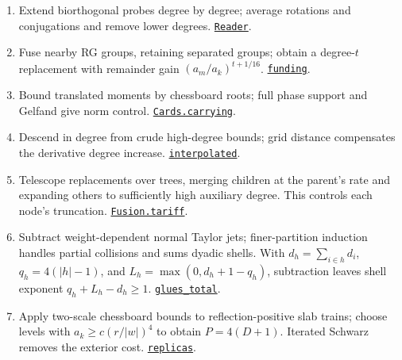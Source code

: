 \documentclass[
  letterpaper,
  11pt]{article}
\providecommand{\tightlist}{%
  \setlength{\itemsep}{0pt}\setlength{\parskip}{0pt}}
\begin{document}
\begin{enumerate}
\def\labelenumi{\arabic{enumi}.}
\tightlist
\item
  Extend biorthogonal probes degree by degree; average rotations and
  conjugations and remove lower degrees.
  \href{https://github.com/yang-mills-group/OpenAI-YM-20261028/blob/3456e5e75cf8d4cd558955a5c7638fba2d68f464/YM/OPE/Orbits/Cuts.lean\#L17-L23}{\texttt{Reader}}.
\item
  Fuse nearby RG groups, retaining separated groups; obtain a
  degree-\(t\) replacement with remainder gain \((a_m/a_k)^{t+1/16}\).
  \href{https://github.com/yang-mills-group/OpenAI-YM-20261028/blob/3456e5e75cf8d4cd558955a5c7638fba2d68f464/YM/OPE/Prices/Circuit.lean\#L64-L87}{\texttt{funding}}.
\item
  Bound translated moments by chessboard roots; full phase support and
  Gelfand give norm control.
  \href{https://github.com/yang-mills-group/OpenAI-YM-20261028/blob/3456e5e75cf8d4cd558955a5c7638fba2d68f464/YM/OPE/Cards/Pressure.lean\#L98-L104}{\texttt{Cards.carrying}}.
\item
  Descend in degree from crude high-degree bounds; grid distance
  compensates the derivative degree increase.
  \href{https://github.com/yang-mills-group/OpenAI-YM-20261028/blob/3456e5e75cf8d4cd558955a5c7638fba2d68f464/YM/OPE/Interpolate/Corridor.lean\#L34-L47}{\texttt{interpolated}}.
\item
  Telescope replacements over trees, merging children at the parent's
  rate and expanding others to sufficiently high auxiliary degree. This
  controls each node's truncation.
  \href{https://github.com/yang-mills-group/OpenAI-YM-20261028/blob/3456e5e75cf8d4cd558955a5c7638fba2d68f464/YM/OPE/Nesting/Fusion.lean\#L97-L104}{\texttt{Fusion.tariff}}.
\item
  Subtract weight-dependent normal Taylor jets; finer-partition
  induction handles partial collisions and sums dyadic shells. With
  \(d_h=\sum_{i\in h}d_i\), \(q_h=4(|h|-1)\), and
  \(L_h=\max(0,d_h+1-q_h)\), subtraction leaves shell exponent
  \(q_h+L_h-d_h\ge1\).
  \href{https://github.com/yang-mills-group/OpenAI-YM-20261028/blob/3456e5e75cf8d4cd558955a5c7638fba2d68f464/YM/Contacts/Solstice/Skies.lean\#L59-L79}{\texttt{glues\_total}}.
\item
  Apply two-scale chessboard bounds to reflection-positive slab trains;
  choose levels with \(a_k\ge c(r/|w|)^4\) to obtain \(P=4(D+1)\).
  Iterated Schwarz removes the exterior cost.
  \href{https://github.com/yang-mills-group/OpenAI-YM-20261028/blob/3456e5e75cf8d4cd558955a5c7638fba2d68f464/YM/Next/PHASE/Seats.lean\#L119-L151}{\texttt{replicas}}.
\end{enumerate}
\end{document}

